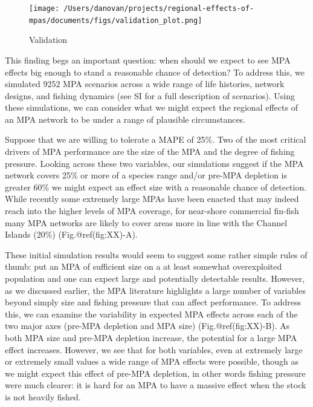 \documentclass[9pt,twocolumn,twoside,lineno]{pnas-new}
\begin{document}
\begin{figure}%
  \centering
  \texttt{[image: /Users/danovan/projects/regional-effects-of-mpas/documents/figs/validation\_plot.png]}
  \caption{Validation}
  \label{val-plot}
\end{figure}

This finding begs an important question: when should we expect to see
MPA effects big enough to stand a reasonable chance of detection? To
address this, we simulated 9252 MPA scenarios across a wide range of
life histories, network designs, and fishing dynamics (see SI for a full
description of scenarios). Using these simulations, we can consider what
we might expect the regional effects of an MPA network to be under a
range of plausible circumstances.

Suppose that we are willing to tolerate a MAPE of 25\%. Two of the most
critical drivers of MPA performance are the size of the MPA and the
degree of fishing pressure. Looking across these two variables, our
simulations suggest if the MPA network covers 25\% or more of a species
range and/or pre-MPA depletion is greater 60\% we might expect an effect
size with a reasonable chance of detection. While recently some
extremely large MPAs have been enacted that may indeed reach into the
higher levels of MPA coverage, for near-shore commercial fin-fish many
MPA networks are likely to cover areas more in line with the Channel
Islands (20\%) (Fig.@ref(fig:XX)-A).

These initial simulation results would seem to suggest some rather
simple rules of thumb: put an MPA of sufficient size on a at least
somewhat overexploited population and one can expect large and
potentially detectable results. However, as we discussed earlier, the
MPA literature highlights a large number of variables beyond simply size
and fishing pressure that can affect performance. To address this, we
can examine the variability in expected MPA effects across each of the
two major axes (pre-MPA depletion and MPA size) (Fig.@ref(fig:XX)-B). As
both MPA size and pre-MPA depletion increase, the potential for a large
MPA effect increases. However, we see that for both variables, even at
extremely large or extremely small values a wide range of MPA effects
were possible, though as we might expect this effect of pre-MPA
depletion, in other words fishing pressure were much clearer: it is hard
for an MPA to have a massive effect when the stock is not heavily
fished.
\end{document}
